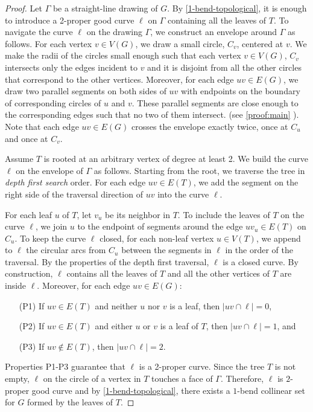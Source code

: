 \begin{proof}

    Let $\Gamma$ be a straight-line drawing of $G$.
    By \cref{1-bend-topological}, it is enough to introduce a 2-proper good curve $\ell$ on $\Gamma$ containing all the leaves of $T$. To navigate the curve $\ell$ on the drawing $\Gamma$, we construct an envelope around $\Gamma$ as follows. For each vertex $v \in V(G)$, we draw a small circle, $C_v$, centered at $v$. We make the radii of the circles small enough such that each vertex $v \in V(G)$, $C_v$ intersects only the edges incident to $v$ and it is disjoint from all the other circles that correspond to the other vertices. Moreover, for each edge $uv \in E(G)$, we draw two parallel segments on both sides of $uv$ with endpoints on the boundary of corresponding circles of $u$ and $v$. These parallel segments are close enough to the corresponding edges such that no two of them intersect. (see \cref{proof:main} ). Note that each edge $uv \in E(G)$ crosses the envelope exactly twice, once at $C_u$ and once at $C_v$.

    Assume $T$ is rooted at an arbitrary vertex of degree at least 2. We build the curve $\ell$ on the envelope of $\Gamma$ as follows. Starting from the root, we traverse the tree in \textit{depth first search} order. For each edge $uv \in E(T)$, we add the segment on the right side of the traversal direction of $uv$ into the curve $\ell$.

    For each leaf $u$ of $T$, let $v_u$ be its neighbor in $T$. To include the leaves of $T$ on the curve $\ell$, we join $u$ to the endpoint of segments around the edge $uv_u \in E(T)$ on $C_u$. To keep the curve $\ell$ closed, for each non-leaf vertex $u \in V(T)$, we append to $\ell$ the circular arcs from $C_u$ between the segments in $\ell$ in the order of the traversal. By the properties of the depth first traversal, $\ell$ is a closed curve. By construction, $\ell$ contains all the leaves of $T$ and all the other vertices of $T$ are inside $\ell$. Moreover, for each edge $uv \in E(G)$:

    \begin{enumerate}
        \item [(P1)] If $uv \in E(T)$ and neither $u$ nor $v$ is a leaf, then $|uv \cap \ell| = 0$,

        \item [(P2)] If $uv \in E(T)$ and either $u$ or $v$ is a leaf of $T$, then $|uv \cap \ell| = 1$, and

        \item [(P3)] If $uv \notin E(T)$, then $|uv \cap \ell| = 2$.
    \end{enumerate}

    Properties P1-P3 guarantee that $\ell$ is a 2-proper curve. Since the tree $T$ is not empty, $\ell$ on the circle of a vertex in $T$ touches a face of $\Gamma$. Therefore, $\ell$ is $2$-proper good curve and by \cref{1-bend-topological}, there exists a $1$-bend collinear set for $G$ formed by the leaves of $T$.
\end{proof}

